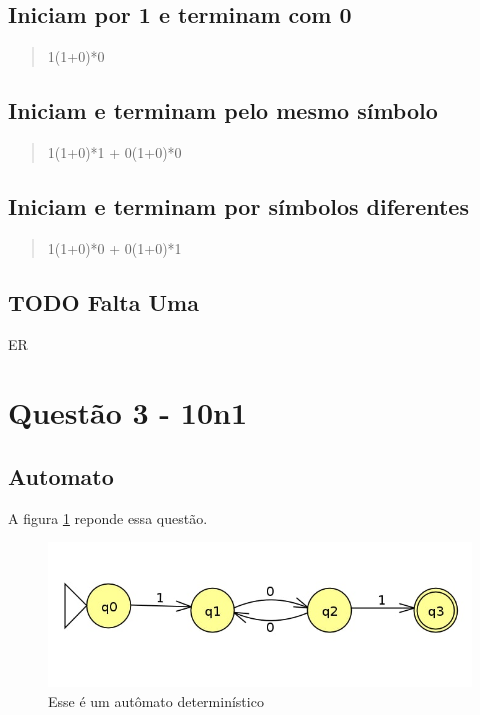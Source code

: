 \documentclass[11pt]{article}
\begin{document}
\subsection{Iniciam por 1 e terminam com 0}
\label{sec:org4d235de}

\begin{quote}
1(1+0)*0 
\end{quote}

\subsection{Iniciam e terminam pelo mesmo símbolo}
\label{sec:org531cd12}

\begin{quote}
1(1+0)*1 + 0(1+0)*0 
\end{quote}

\subsection{Iniciam e terminam por símbolos diferentes}
\label{sec:org4b51256}

\begin{quote}
1(1+0)*0 + 0(1+0)*1 
\end{quote}

\subsection{{\bfseries\sffamily TODO} Falta Uma}
\label{sec:org955f8ae}

ER 

\section{Questão 3 - 10n1}
\label{sec:orgf83d648}
\subsection{Automato}
\label{sec:org974bac9}
A figura \ref{fig:orgd011d0b} reponde essa questão. 

\begin{figure}[htbp]
\centering
\includegraphics[width=.9\linewidth]{./q3/q3.jpg}
\caption{\label{fig:orgd011d0b}
Esse é um autômato determinístico}
\end{figure}
\end{document}
